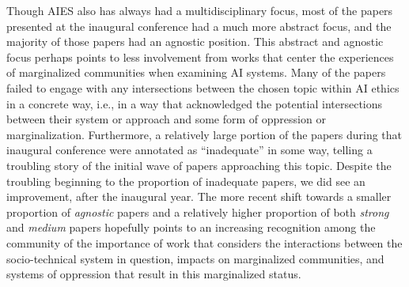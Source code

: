 \documentclass[manuscript]{acmart}
\begin{document}
Though AIES also has always had a multidisciplinary focus, most of the papers presented at the inaugural conference had a much more abstract focus, and the majority of those papers had an agnostic position. This abstract and agnostic focus perhaps points to less involvement from works %
that center the experiences of marginalized communities when examining %
AI systems. %
Many of the papers failed to engage with any intersections between the chosen topic within AI ethics in a concrete way, i.e., in a way that acknowledged the potential intersections between their system or approach and some form of oppression or marginalization. Furthermore, a relatively large portion of the papers during that inaugural conference were annotated as ``inadequate'' in some way, telling a troubling story of the initial wave of papers approaching this topic. Despite the troubling beginning to the proportion of inadequate papers, we did see an improvement, after the inaugural year. %
The more recent shift towards a smaller proportion of \textit{agnostic} papers and a relatively higher proportion of both \textit{strong} and \textit{medium} papers hopefully points to an increasing recognition among the community of the importance of work that considers the interactions between the socio-technical system in question, %
impacts on marginalized communities, and systems of oppression that result in this marginalized status.  
\end{document}
